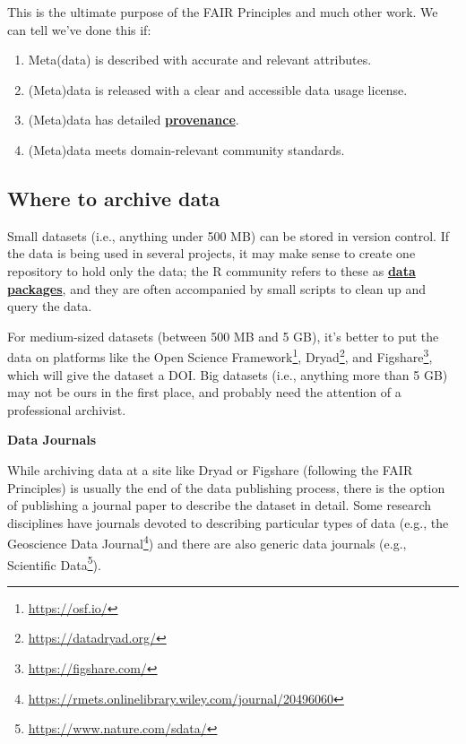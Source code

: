 \documentclass[
]{krantz}
\providecommand{\tightlist}{%
  \setlength{\itemsep}{0pt}\setlength{\parskip}{0pt}}
\renewenvironment{quote}{\begin{VF}}{\end{VF}}
\renewcommand{\href}[2]{#2\footnote{\url{#1}}}
\newcommand{\gref}[2]{\hyperlink{#2}{\textbf{#1}}}
\begin{document}
This is the ultimate purpose of the FAIR Principles and much other work.
We can tell we've done this if:

\begin{enumerate}
\def\labelenumi{\arabic{enumi}.}
\tightlist
\item
  Meta(data) is described with accurate and relevant attributes.
\item
  (Meta)data is released with a clear and accessible data usage license.
\item
  (Meta)data has detailed \gref{provenance}{provenance}.
\item
  (Meta)data meets domain-relevant community standards.
\end{enumerate}

\hypertarget{provenance-data-where}{%
\subsection{Where to archive data}\label{provenance-data-where}}

Small datasets (i.e., anything under 500 MB) can be stored in version control.
If the data is being used in several projects,
it may make sense to create one repository to hold only the data;
the R community refers to these as \gref{data packages}{data\_package},
and they are often accompanied by small scripts to clean up and query the data.

For medium-sized datasets (between 500 MB and 5 GB),
it's better to put the data on platforms
like the \href{https://osf.io/}{Open Science Framework}, \href{https://datadryad.org/}{Dryad}, and \href{https://figshare.com/}{Figshare},
which will give the dataset a DOI.
Big datasets (i.e., anything more than 5 GB)
may not be ours in the first place,
and probably need the attention of a professional archivist.

\begin{quote}
\textbf{Data Journals}

While archiving data at a site like Dryad or Figshare (following the FAIR Principles)
is usually the end of the data publishing process,
there is the option of publishing a journal paper to describe the dataset in detail.
Some research disciplines have journals devoted
to describing particular types of data
(e.g., the \href{https://rmets.onlinelibrary.wiley.com/journal/20496060}{Geoscience Data Journal})
and there are also generic data journals
(e.g., \href{https://www.nature.com/sdata/}{Scientific Data}).
\end{quote}
\end{document}
